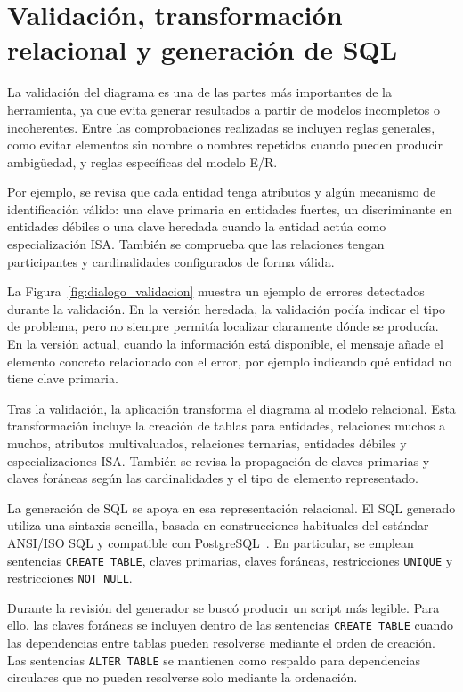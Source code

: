 \section{Validación, transformación relacional y generación de SQL}

La validación del diagrama es una de las partes más importantes de la herramienta, ya que evita generar resultados a partir de modelos incompletos o incoherentes. Entre las comprobaciones realizadas se incluyen reglas generales, como evitar elementos sin nombre o nombres repetidos cuando pueden producir ambigüedad, y reglas específicas del modelo E/R.

Por ejemplo, se revisa que cada entidad tenga atributos y algún mecanismo de identificación válido: una clave primaria en entidades fuertes, un discriminante en entidades débiles o una clave heredada cuando la entidad actúa como especialización ISA. También se comprueba que las relaciones tengan participantes y cardinalidades configurados de forma válida.

La Figura~\ref{fig:dialogo_validacion} muestra un ejemplo de errores detectados durante la validación. En la versión heredada, la validación podía indicar el tipo de problema, pero no siempre permitía localizar claramente dónde se producía. En la versión actual, cuando la información está disponible, el mensaje añade el elemento concreto relacionado con el error, por ejemplo indicando qué entidad no tiene clave primaria.


Tras la validación, la aplicación transforma el diagrama al modelo relacional. Esta transformación incluye la creación de tablas para entidades, relaciones muchos a muchos, atributos multivaluados, relaciones ternarias, entidades débiles y especializaciones ISA. También se revisa la propagación de claves primarias y claves foráneas según las cardinalidades y el tipo de elemento representado.

La generación de SQL se apoya en esa representación relacional. El SQL generado utiliza una sintaxis sencilla, basada en construcciones habituales del estándar ANSI/ISO SQL y compatible con PostgreSQL~\cite{postgresqlCreateTable}. En particular, se emplean sentencias \texttt{CREATE TABLE}, claves primarias, claves foráneas, restricciones \texttt{UNIQUE} y restricciones \texttt{NOT NULL}.

Durante la revisión del generador se buscó producir un script más legible. Para ello, las claves foráneas se incluyen dentro de las sentencias \texttt{CREATE TABLE} cuando las dependencias entre tablas pueden resolverse mediante el orden de creación. Las sentencias \texttt{ALTER TABLE} se mantienen como respaldo para dependencias circulares que no pueden resolverse solo mediante la ordenación.

